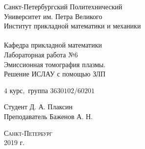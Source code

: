 \documentclass[a4]{article}
\begin{document}
\def\contentsname{\LARGE{Содержание}}
\thispagestyle{empty}
\begin{center} 
\vspace{2cm} 
{\Large \sc Санкт-Петербургский Политехнический}\\
\vspace{2mm}
{\Large \sc Университет} им. {\Large\sc Петра Великого}\\
\vspace{1cm}
{\large \sc Институт прикладной математики и механики\\ 
\vspace{0.5mm}
\textsc{}}\\ 
\vspace{0.5mm}
{\large\sc Кафедра прикладной математики}\\
\vspace{15mm}
{\huge \sc Лабораторная работа №$6$\\
\vspace{4mm}
Эмиссионная томография плазмы. \\
\vspace{4mm}
Решение ИСЛАУ с помощью ЗЛП
\vspace{6mm}
 }
\vspace*{2mm}
\vspace{1cm}

{\sc $4$ курс$,$ группа $3630102/60201$}

\vspace{2cm} 
Студент \hfill Д. А. Плаксин\\
\vspace{1cm}
Преподаватель \hfill Баженов А. Н.\\
\vspace{20mm} 

\end{center} 
\begin{center}
\vfill {\large\textsc{Санкт-Петербург}}\\ 
2019 г.
\end{center}

\end{document}
